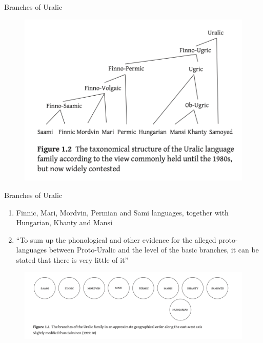 \documentclass[10 pt, handout]{beamer}
\begin{document}
\begin{frame}{Branches of Uralic}

	\begin{figure}[H]
		\centering
		\includegraphics[scale=.65]{uralic-1980s}
		\parencite{aikio2022}
	\end{figure}

\end{frame}

\begin{frame}{Branches of Uralic}

	\begin{enumerate}[$\gg$]
		\item Finnic, Mari, Mordvin, Permian and Sami languages, together with Hungarian, Khanty and Mansi  
		\item ``To sum up the phonological and other evidence for the alleged proto-languages between Proto-Uralic and the level of the basic branches, it can be stated that there is very little of it'' \parencite{salminen2002}
	\end{enumerate}
	
	\begin{figure}[H]
		\centering
		\includegraphics[scale=.37]{uralic-continuum}
		\parencite{aikio2022}
	\end{figure}

\end{frame}
\end{document}
